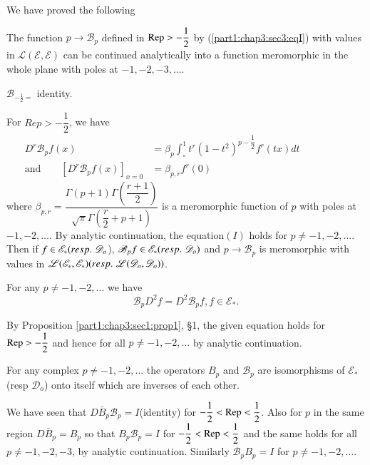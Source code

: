 We have proved the following
\begin{theorem*}
  The function $p \to \mathscr{B}_p$ defined in $\operatorname{Rep} > -
  \dfrac{1}{2}$ by (\ref{part1:chap3:sec3:eqI}) with values in $\mathscr{L}(\mathscr{E},
  \mathscr{E})$ can be continued analytically into a function
  meromorphic  in the whole plane with poles at $-1, -2, -3, \ldots$. 
\end{theorem*}

\begin{rem}\label{part1:chap3:sec3:rem1}%
  $\mathscr{B}_{- \frac{1}{2}= }$ identity.
\end{rem}

\begin{rem}\label{part1:chap3:sec3:rem2}%
  For $Rep > - \dfrac{1}{2}$, we have
  \begin{align*}
  D^r \mathscr{B}_p f(x) & = \beta _p \int^{1}_{\circ} t^r (1-t^2)^{p -
    \dfrac{1}{2}}f ^r (tx) dt\hspace{2cm} \\
  \text{and} \qquad  
    [D^r \mathscr{B }_p f (x) ]_{x=0} & = \beta _{p,r}f^r (0)
    \tag{4}\label{part1:chap3:sec3:eq4} 
  \end{align*}
  where $\beta_{p,r}= \dfrac{\Gamma (p+1) \Gamma
    \left(\dfrac{r+1}{2}\right)}{\sqrt{\pi} \Gamma \left(\dfrac{r}{2}+
    p+1\right)}$ is a
  meromorphic  function of $p$ with poles at $-1,-2, \ldots $. By
  analytic continuation, the equation\pageoriginale $(I)$ holds for $p \neq -1, -2,
  \ldots$. Then if $f\in \mathscr{E}_{*} ({resp.}\kern.3em \mathscr{D}_o$),
  $\mathscr{B}_{p} f \in \mathscr{E}_{*} ({resp.}\kern.3em \mathscr{D}_o)$ and $p
  \to \mathscr{B}_p$ is meromorphic with values in
  $\mathscr{L}(\mathscr{E}_{*}, \mathscr{E}_{*}) ({resp.}\kern.3em 
  \mathscr{L}(\mathscr{D}_o,  \mathscr{D}_o))$. 
\end{rem}

\begin{theorem*}
  For any $p \neq -1, -2,  \ldots$ we have
  $$
  \mathscr{B}_p D^2 f = D^2 \mathscr{B}_p f,  f \in \mathscr{E}_{*}.
  $$
\end{theorem*} 

By Proposition \ref{part1:chap3:sec1:prop1}, \S 1, the given equation holds for  $ \operatorname{Rep} >
-\dfrac{1}{2}$ and hence for all $p \neq -1, -2, \ldots $ by analytic
continuation. 

\begin{theorem*}
  For any complex $p \neq -1, -2, \ldots $ the operators $B_p$ and
  $\mathscr{B}_p$ are isomorphisms of $\mathscr{E}_*$ (resp
  $\mathscr{D}_o$) onto itself which are inverses of each other. 
\end{theorem*} 
 
 We have seen that $D\bar{B}_p \mathscr{B}_p = I $(identity) for $-
 \dfrac{1}{2} < \operatorname{Rep} < \dfrac{1}{2}$. Also for $p$ in the same region
 $D\bar{B}_p = B_p$ so that $B_p \mathscr{B}_p = I$ for $-
 \dfrac{1}{2}< \operatorname{Rep} < \dfrac{1}{2}$ and the same holds for all $p \neq
 -1, -2, -3$, by analytic continuation. Similarly $\mathscr{B}_p B_p
 =I$ for $p \neq -1, -2,  \ldots$. 
 
